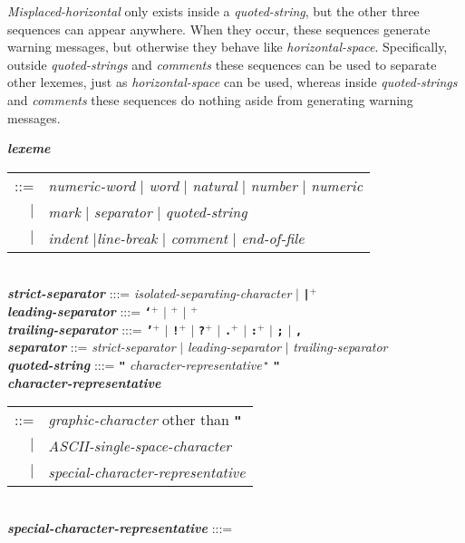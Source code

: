 \documentclass[12pt]{article}
\newcommand{\TT}[1]{{\tt \bfseries #1}}
\newcommand{\STAR}{{\Large $^\star$}}
\newcommand{\PLUS}[1][]{{$^{+#1}$}}
\newcommand{\emkey}[1]{{\em \bfseries #1}}
\newlength{\figurewidth}
\newenvironment{boxedfigure}[1][!btp]%
	{\begin{figure*}[#1]
	 \begin{lrbox}{\figurebox}
	 \begin{minipage}{\figurewidth}

	 \vspace*{1ex}}%
	{
	 \vspace*{1ex}

	 \end{minipage}
	 \end{lrbox}

	 \centering
	 \fbox{\hspace*{0.1in}\usebox{\figurebox}\hspace*{0.1in}}
	 \end{figure*}}
\begin{document}
{\em Misplaced-horizontal} only exists inside a {\em quoted-string},
but the other three sequences can appear anywhere.  When they occur,
these sequences generate warning messages, but otherwise they behave
like {\em horizontal-space}.  Specifically, outside {\em quoted-strings}
and {\em comments} these sequences can be used to separate other lexemes,
just as {\em horizontal-space} can be used,
whereas inside {\em quoted-strings} and
{\em comments} these sequences do nothing aside from generating
warning messages.

\begin{boxedfigure}[!p]

\emkey{lexeme}
        \begin{tabular}[t]{rl}
	::= & {\em numeric-word} $|$ {\em word} $|$
	      {\em natural} $|$ {\em number} $|$ {\em numeric} \\
	$|$ & {\em mark} $|$ {\em separator} $|$ {\em quoted-string} \\
	$|$ & {\em indent} $|${\em line-break} $|$
	      {\em comment} $|$ {\em end-of-file}
	\end{tabular}
\label{LEXEME}
\\[1ex]
\emkey{strict-separator} :::= {\em isolated-separating-character} $|$
                              \TT{|}\PLUS{}
\\[0.5ex]
\emkey{leading-separator} :::=
	\TT{`}\PLUS{} $|$
	\TT{\textexclamdown}\PLUS{} $|$ \TT{\textquestiondown}\PLUS{}
\\[0.5ex]
\emkey{trailing-separator} :::= \TT{'}\PLUS{} $|$
				   \TT{!}\PLUS{} $|$
				   \TT{?}\PLUS{} $|$
				   \TT{.}\PLUS{} $|$
				   \TT{:}\PLUS{} $|$
				   \TT{;} $|$
				   \TT{,}
\\[0.5ex]
\emkey{separator}
    ::= {\em strict-separator}
    $|$ {\em leading-separator}
    $|$ {\em trailing-separator}
\\[1ex]
\emkey{quoted-string}\label{QUOTED-STRING} :::=
    \TT{"} {\em character-representative}\,\STAR{} \TT{"}
\\[0.3ex]
\emkey{character-representative}\label{CHARACTER-REPRESENTATIVE}
	\begin{tabular}[t]{@{}rl@{}}
	::= & {\em graphic-character} other than \TT{"} \\
	$|$ & {\em ASCII-single-space-character} \\
	$|$ & {\em special-character-representative} \\
	\end{tabular}
\\[0.3ex]
\emkey{special-character-representative} :::=

\end{boxedfigure}
\end{document}

